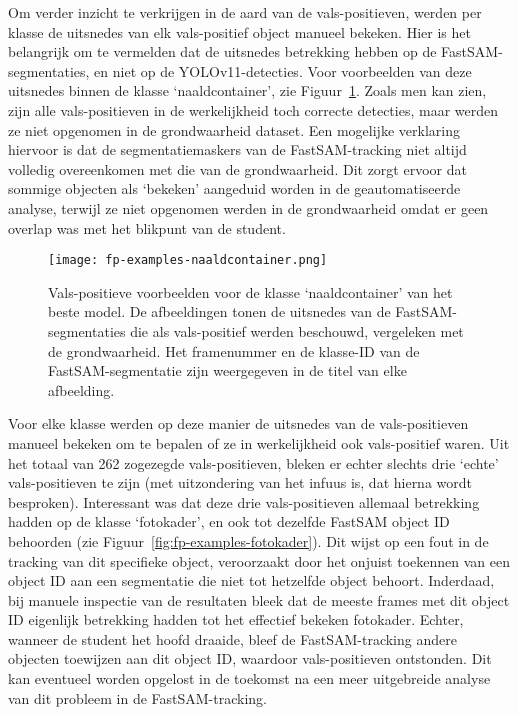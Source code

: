 Om verder inzicht te verkrijgen in de aard van de vals-positieven, werden per klasse de uitsnedes van elk vals-positief object manueel bekeken.
Hier is het belangrijk om te vermelden dat de uitsnedes betrekking hebben op de FastSAM-segmentaties,
en niet op de YOLOv11-detecties.
Voor voorbeelden van deze uitsnedes binnen de klasse `naaldcontainer', zie Figuur~\ref{fig:fp-examples-naaldcontainer}.
Zoals men kan zien, zijn alle vals-positieven in de werkelijkheid toch correcte detecties, maar werden ze niet opgenomen in de grondwaarheid dataset.
Een mogelijke verklaring hiervoor is dat de segmentatiemaskers van de FastSAM-tracking niet altijd volledig 
overeenkomen met die van de grondwaarheid.
Dit zorgt ervoor dat sommige objecten als `bekeken' aangeduid worden in de geautomatiseerde analyse, 
terwijl ze niet opgenomen werden in de grondwaarheid omdat er geen overlap was met het blikpunt van de student.
\begin{figure}[H]
    \centering
    \texttt{[image: fp-examples-naaldcontainer.png]}
    \caption[]{\label{fig:fp-examples-naaldcontainer}
    Vals-positieve voorbeelden voor de klasse `naaldcontainer' van het beste model.
    De afbeeldingen tonen de uitsnedes van de FastSAM-segmentaties die als vals-positief werden beschouwd, vergeleken met de grondwaarheid.
    Het framenummer en de klasse-ID van de FastSAM-segmentatie zijn weergegeven in de titel van elke afbeelding.
    }
\end{figure}

Voor elke klasse werden op deze manier de uitsnedes van de vals-positieven manueel bekeken om te bepalen of ze in werkelijkheid ook vals-positief waren.
Uit het totaal van 262 zogezegde vals-positieven, bleken er echter slechts drie `echte' vals-positieven te zijn (met uitzondering van het infuus is, dat hierna wordt besproken).
Interessant was dat deze drie vals-positieven allemaal betrekking hadden op de klasse `fotokader', en ook tot dezelfde FastSAM object ID behoorden (zie Figuur~\ref{fig:fp-examples-fotokader}).
Dit wijst op een fout in de tracking van dit specifieke object, veroorzaakt door het onjuist toekennen van een object ID aan een segmentatie die niet tot hetzelfde object behoort.
Inderdaad, bij manuele inspectie van de resultaten bleek dat de meeste frames met dit object ID eigenlijk betrekking hadden tot het effectief bekeken fotokader.
Echter, wanneer de student het hoofd draaide, bleef de FastSAM-tracking andere objecten toewijzen aan dit object ID, waardoor vals-positieven ontstonden.
Dit kan eventueel worden opgelost in de toekomst na een meer uitgebreide analyse van dit probleem in de FastSAM-tracking.

